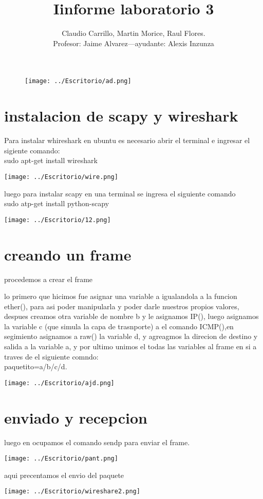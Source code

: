 \documentclass[11pt,a4paper]{report}
\author{Claudio Carrillo, Martin Morice, Raul Flores. \\ Profesor: Jaime Alvarez---ayudante: Alexis Inzunza}
\title{Iinforme laboratorio 3}
\begin{document}
\begin{figure}[hbtp]
\texttt{[image: ../Escritorio/ad.png]}
\end{figure}

\maketitle
\part{instalacion de scapy y wireshark}
Para instalar whireshark en ubuntu es necesario abrir el terminal e ingresar el sigiente comando:\\ sudo apt-get  install wireshark

\texttt{[image: ../Escritorio/wire.png]} 

luego para instalar scapy en una terminal se ingresa el siguiente comando \\ sudo atp-get install python-scapy

\texttt{[image: ../Escritorio/12.png]} 
\part{creando un frame}
 procedemos a crear el frame
 
 lo primero que hicimos fue asignar una variable a igualandola a la funcion ether(), para asi poder manipularla y poder darle nuestros propios valores, despues creamos otra variable de nombre b y le asignamos IP(), luego asignamos la variable c (que simula la capa de trasnporte) a el comando ICMP(),en segimiento asignamos a raw() la variable d, y agreagmos la direcion de destino y salida a la variable a, y por ultimo unimos el todas las variables al frame en si a traves de el siguiente comndo: \\ paquetito=a/b/c/d.
   
 
\texttt{[image: ../Escritorio/ajd.png]} 

\part{enviado y recepcion}

luego en ocupamos el comando sendp para enviar el frame.

\texttt{[image: ../Escritorio/pant.png]} 

aqui precentamos el envio del paquete

\texttt{[image: ../Escritorio/wireshare2.png]} 
\end{document}

